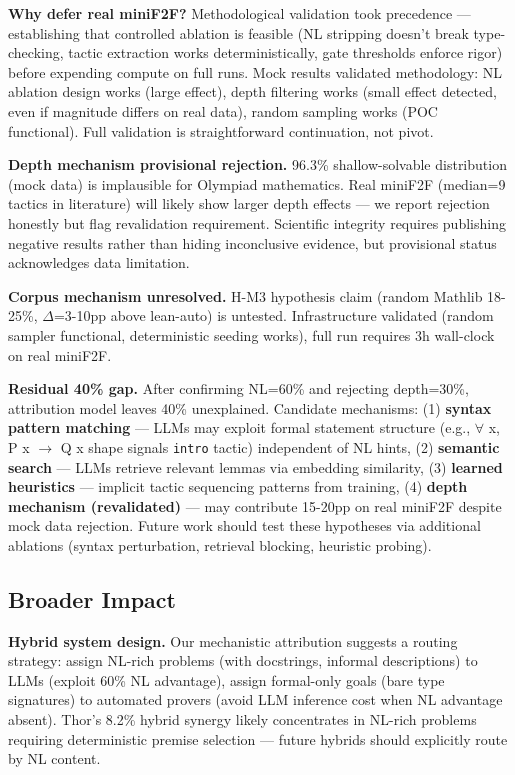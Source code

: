 \textbf{Why defer real miniF2F?} Methodological validation took precedence --- establishing that controlled ablation is feasible (NL stripping doesn't break type-checking, tactic extraction works deterministically, gate thresholds enforce rigor) before expending compute on full runs. Mock results validated methodology: NL ablation design works (large effect), depth filtering works (small effect detected, even if magnitude differs on real data), random sampling works (POC functional). Full validation is straightforward continuation, not pivot.

\textbf{Depth mechanism provisional rejection.} 96.3\% shallow-solvable distribution (mock data) is implausible for Olympiad mathematics. Real miniF2F (median=9 tactics in literature) will likely show larger depth effects --- we report rejection honestly but flag revalidation requirement. Scientific integrity requires publishing negative results rather than hiding inconclusive evidence, but provisional status acknowledges data limitation.

\textbf{Corpus mechanism unresolved.} H-M3 hypothesis claim (random Mathlib 18-25\%, $\Delta$=3-10pp above lean-auto) is untested. Infrastructure validated (random sampler functional, deterministic seeding works), full run requires 3h wall-clock on real miniF2F.

\textbf{Residual 40\% gap.} After confirming NL=60\% and rejecting depth=30\%, attribution model leaves 40\% unexplained. Candidate mechanisms: (1) \textbf{syntax pattern matching} --- LLMs may exploit formal statement structure (e.g., $\forall$ x, P x $\rightarrow$ Q x shape signals \texttt{intro} tactic) independent of NL hints, (2) \textbf{semantic search} --- LLMs retrieve relevant lemmas via embedding similarity, (3) \textbf{learned heuristics} --- implicit tactic sequencing patterns from training, (4) \textbf{depth mechanism (revalidated)} --- may contribute 15-20pp on real miniF2F despite mock data rejection. Future work should test these hypotheses via additional ablations (syntax perturbation, retrieval blocking, heuristic probing).

\subsection{Broader Impact}

\textbf{Hybrid system design.} Our mechanistic attribution suggests a routing strategy: assign NL-rich problems (with docstrings, informal descriptions) to LLMs (exploit 60\% NL advantage), assign formal-only goals (bare type signatures) to automated provers (avoid LLM inference cost when NL advantage absent). Thor's 8.2\% hybrid synergy likely concentrates in NL-rich problems requiring deterministic premise selection --- future hybrids should explicitly route by NL content.

